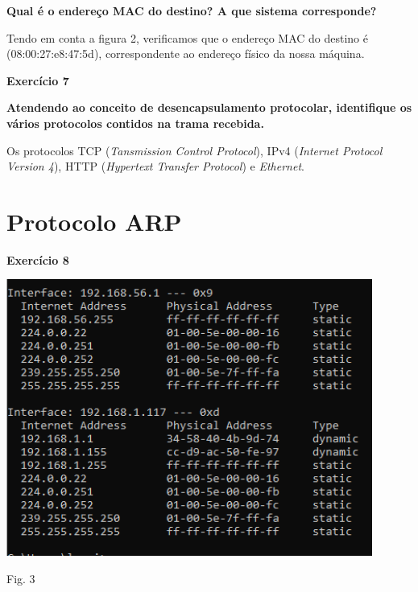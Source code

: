 \documentclass{article}
\begin{document}
\vspace{0.5cm}

\textbf{Qual é o endereço MAC do destino? A que sistema corresponde?}\vspace{0.35cm}

\hspace{0.5cm}Tendo em conta a figura 2, verificamos que o endereço MAC do destino é (08:00:27:e8:47:5d), correspondente ao endereço físico da nossa máquina.

\vspace{0.5cm}
{\textbf{Exercício 7}}\vspace{0.5cm}

\textbf{Atendendo ao conceito de desencapsulamento protocolar, identifique os vários protocolos contidos na trama recebida.}\vspace{0.35cm}

\hspace{0.5cm}Os protocolos TCP (\textit{Tansmission Control Protocol}), IPv4 (\textit{Internet Protocol Version 4}), HTTP (\textit{Hypertext Transfer Protocol}) e \textit{Ethernet}.

\vspace{0.5cm}
\clearpage

\section{Protocolo ARP }\vspace{0.5cm}

\textbf{Exercício 8}

\vspace{0.5cm}
\begin{center}
\includegraphics[width = 12cm]{2.png}

\caption{Fig. 3}
\end{center}
\end{document}
